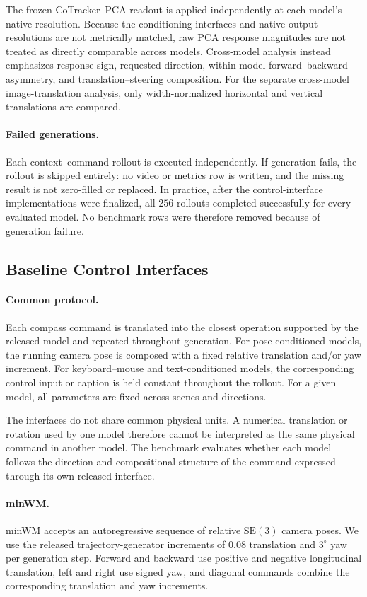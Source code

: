 \documentclass[letterpaper]{article} %
\begin{document}
The frozen CoTracker--PCA readout is applied independently at each model's
native resolution. Because the conditioning interfaces and native output
resolutions are not metrically matched, raw PCA response magnitudes are not
treated as directly comparable across models. Cross-model analysis instead
emphasizes response sign, requested direction, within-model
forward--backward asymmetry, and translation--steering composition. For the
separate cross-model image-translation analysis, only width-normalized
horizontal and vertical translations are compared.

\paragraph{Failed generations.}
Each context--command rollout is executed independently. If generation fails,
the rollout is skipped entirely: no video or metrics row is written, and the
missing result is not zero-filled or replaced. In practice, after the
control-interface implementations were finalized, all $256$ rollouts
completed successfully for every evaluated model. No benchmark rows were
therefore removed because of generation failure.


\subsection{Baseline Control Interfaces}
\label{app:baseline_controls}

\paragraph{Common protocol.}
Each compass command is translated into the closest operation supported by the
released model and repeated throughout generation. For pose-conditioned
models, the running camera pose is composed with a fixed relative translation
and/or yaw increment. For keyboard--mouse and text-conditioned models, the
corresponding control input or caption is held constant throughout the
rollout. For a given model, all parameters are fixed across scenes and
directions.

The interfaces do not share common physical units. A numerical translation or
rotation used by one model therefore cannot be interpreted as the same
physical command in another model. The benchmark evaluates whether each model
follows the direction and compositional structure of the command expressed
through its own released interface.

\paragraph{minWM.}
minWM accepts an autoregressive sequence of relative $\mathrm{SE}(3)$ camera
poses. We use the released trajectory-generator increments of $0.08$
translation and $3^\circ$ yaw per generation step. Forward and backward use
positive and negative longitudinal translation, left and right use signed
yaw, and diagonal commands combine the corresponding translation and yaw
increments.
\end{document}
